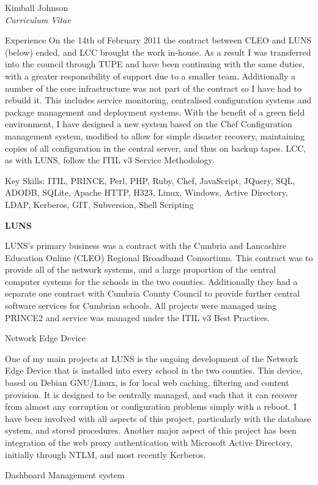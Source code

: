\documentclass[10pt]{article}
\newenvironment{subbulletlist}{%
	\begin{list}{\labelitemii}{%
		\setlength{\topsep}{\itemsep}\setlength{\parskip}{\parsep}%
	}%
}%
{ \end{list} }
\begin{document}
\begin{cv}{Kimball Johnson\\{\large \itshape Curriculum Vitae}}
\begin{cvlist}{Experience}
    On the 14th of February 2011 the contract between CLEO and LUNS (below)
    ended, and LCC brought the work in-house.  As a result I was transferred into
    the council through TUPE and have been continuing with the same duties, with 
	a greater responsibility of support due to a smaller team.  Additionally a number 
	of the core infrastructure was not part of the contract so I have had to rebuild it.
	This includes service monitoring, centralised configuration systems and 
	package management and deployment systems.  With the benefit of a green field
	environment, I have designed a new system based on the Chef Configuration management
	system, modified to allow for simple disaster recovery, maintaining copies of all
	configuration in the central server, and thus on backup tapes. LCC, as with LUNS,
	follow the ITIL v3 Service Methodology.   
	
	Key Skills: ITIL, PRINCE, Perl, PHP, Ruby, Chef, JavaScript, JQuery, 
	SQL, ADODB, SQLite, Apache HTTP, H323, Linux, Windows, Active Directory, LDAP, 
	Kerberos, GIT, Subversion, Shell Scripting
	\item \textbf{LUNS}

    LUNS's primary business was a contract with the Cumbria and Lancashire
    Education Online (CLEO) Regional Broadband Consortium.  This contract was
    to provide all of the network systems, and a large proportion of the
    central computer systems for the schools in the two counties.
    Additionally they had a separate one contract with Cumbria County Council to
    provide further central software services for Cumbrian schools. All projects 
	were managed using PRINCE2 and service was managed under the ITIL v3 Best Practices.
	\begin{subbulletlist}
    \item Network Edge Device

        One of my main projects at LUNS is the ongoing development of the
        Network Edge Device that is installed into every school in the two
        counties.  This device, based on Debian GNU/Linux, is for local 
        web caching, filtering and content provision.  It is designed to 
        be centrally managed, and such that it can recover from almost any
        corruption or configuration problems simply with a reboot. I have 
        been involved with all aspects of this project, particularly with the 
        database system, and stored procedures. Another major aspect of this 
        project has been integration of the web proxy authentication with
        Microsoft Active Directory, initially through NTLM, and most recently
        Kerberos. 
    \item Dashboard Management system


\end{subbulletlist}
\end{cvlist}
\end{cv}
\end{document}

